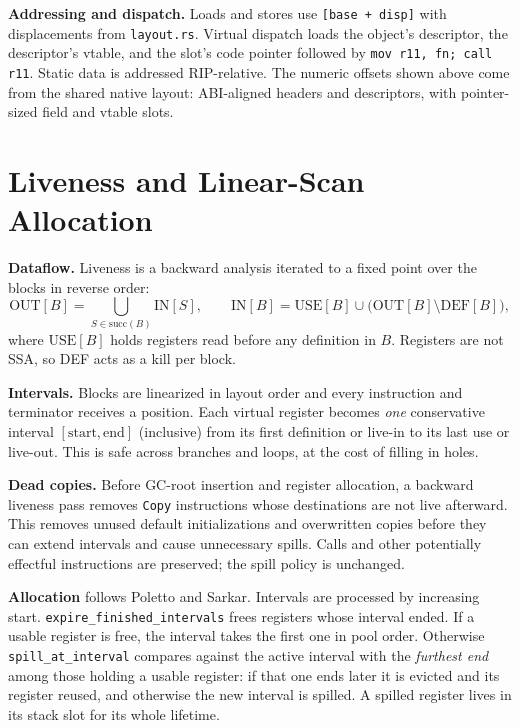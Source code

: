 \documentclass[10pt]{article}
\newcommand{\code}[1]{\texttt{\small #1}}
\begin{document}
\textbf{Addressing and dispatch.} Loads and stores use \code{[base + disp]} with displacements from \code{layout.rs}. Virtual dispatch loads the object's descriptor, the descriptor's vtable, and the slot's code pointer followed by \code{mov r11, fn; call r11}. Static data is addressed RIP-relative. The numeric offsets shown above come from the shared native layout: ABI-aligned headers and descriptors, with pointer-sized field and vtable slots.

\section{Liveness and Linear-Scan Allocation}
\textbf{Dataflow.} Liveness is a backward analysis iterated to a fixed point over the blocks in reverse order:
\[
  \mathrm{OUT}[B] = \bigcup_{S \in \mathrm{succ}(B)} \mathrm{IN}[S],
  \qquad
  \mathrm{IN}[B] = \mathrm{USE}[B] \cup \bigl(\mathrm{OUT}[B] \setminus \mathrm{DEF}[B]\bigr),
\]
where $\mathrm{USE}[B]$ holds registers read before any definition in $B$. Registers are not SSA, so DEF acts as a kill per block.

\textbf{Intervals.} Blocks are linearized in layout order and every instruction and terminator receives a position. Each virtual register becomes \emph{one} conservative interval $[\text{start},\text{end}]$ (inclusive) from its first definition or live-in to its last use or live-out. This is safe across branches and loops, at the cost of filling in holes.

\textbf{Dead copies.} Before GC-root insertion and register allocation, a backward liveness pass removes \code{Copy} instructions whose destinations are not live afterward. This removes unused default initializations and overwritten copies before they can extend intervals and cause unnecessary spills. Calls and other potentially effectful instructions are preserved; the spill policy is unchanged.

\textbf{Allocation} follows Poletto and Sarkar. Intervals are processed by increasing start. \code{expire\_finished\_intervals} frees registers whose interval ended. If a usable register is free, the interval takes the first one in pool order. Otherwise \code{spill\_at\_interval} compares against the active interval with the \emph{furthest end} among those holding a usable register: if that one ends later it is evicted and its register reused, and otherwise the new interval is spilled. A spilled register lives in its stack slot for its whole lifetime.
\end{document}
